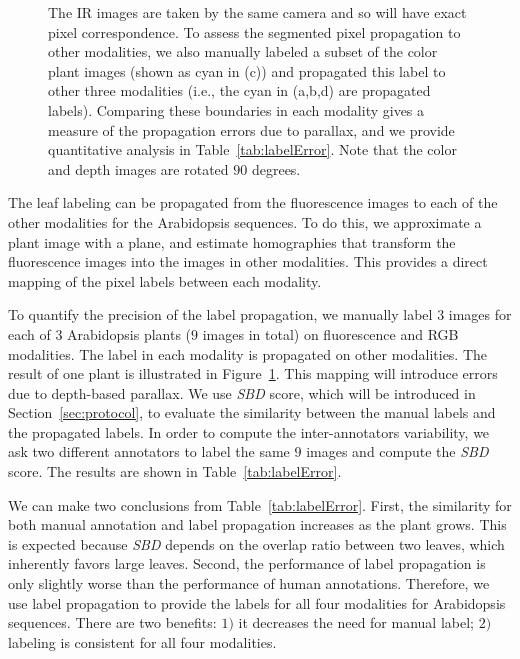 \begin{figure}[t]
\begin{centering}
{The IR images are taken by the same camera and so will have exact pixel correspondence.
To assess the segmented pixel propagation to other modalities, we also manually labeled a subset of the color plant images (shown as cyan in (c)) and propagated this label to other three modalities (i.e., the cyan in (a,b,d) are propagated labels).
Comparing these boundaries in each modality gives a measure of the propagation errors due to parallax, and we provide quantitative analysis in Table~\ref{tab:labelError}.
Note that the color and depth images are rotated $90$ degrees.}
\label{fig:LabelAlignment}
\end{centering}
\end{figure}

The leaf labeling can be propagated from the fluorescence images to each of the other modalities for the Arabidopsis sequences.
To do this, we approximate a plant image with a plane, and estimate homographies that transform the fluorescence images into the images in other modalities.
This provides a direct mapping of the pixel labels between each modality.

To quantify the precision of the label propagation, we manually label $3$ images for each of $3$ Arabidopsis plants ($9$ images in total) on fluorescence and RGB modalities.
The label in each modality is propagated on other modalities.
The result of one plant is illustrated in Figure~\ref{fig:LabelAlignment}.
This mapping will introduce errors due to depth-based parallax.
We use {\it{SBD}} score, which will be introduced in Section~\ref{sec:protocol}, to evaluate the similarity between the manual labels and the propagated labels.
In order to compute the inter-annotators variability, we ask two different annotators to label the same $9$ images and compute the {\it{SBD}} score.
The results are shown in Table~\ref{tab:labelError}.

We can make two conclusions from Table~\ref{tab:labelError}.
First, the similarity for both manual annotation and label propagation increases as the plant grows.
This is expected because {\it{SBD}} depends on the overlap ratio between two leaves, which inherently favors large leaves.
Second, the performance of label propagation is only slightly worse than the performance of human annotations.
Therefore, we use label propagation to provide the labels for all four modalities for Arabidopsis sequences.
There are two benefits: $1)$ it decreases the need for manual label; $2)$ labeling is consistent for all four modalities.

